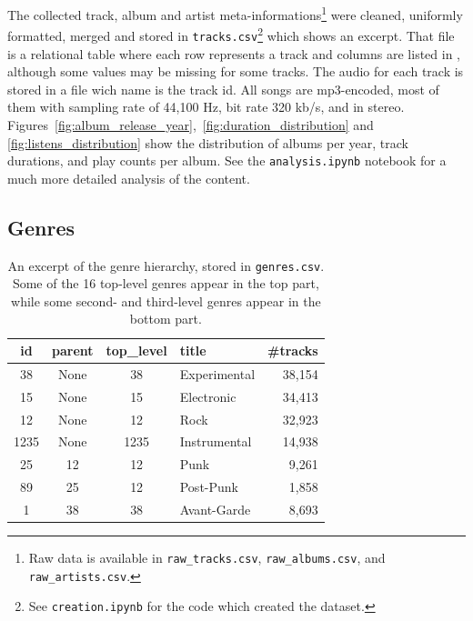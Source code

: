 \documentclass{article}
\newcommand{\todo}[1]{{\color{red} #1}}
\begin{document}
The collected track, album and artist meta-informations\footnote{Raw data is available in \texttt{raw\_tracks.csv}, \texttt{raw\_albums.csv}, and \texttt{raw\_artists.csv}.} were cleaned, uniformly formatted, merged and stored in \texttt{tracks.csv}\footnote{\label{creation}See \texttt{creation.ipynb} for the code which created the dataset.} which  shows an excerpt. That file is a relational table where each row represents a track and columns are listed in , although some values may be missing for some tracks. The audio for each track is stored in a file wich name is the track id. All songs are mp3-encoded, most of them with sampling rate of 44,100 Hz, bit rate 320 kb/s, and in stereo. Figures~\ref{fig:album_release_year},~\ref{fig:duration_distribution} and \ref{fig:listens_distribution} show the distribution of albums per year, track durations, and play counts per album.
See the \texttt{analysis.ipynb} notebook for a much more detailed analysis of the content.


\subsection{Genres}

\begin{table}
	\centering
	\begin{tabular}{ccclr}
		\toprule
		id & parent & top\_level & title & \#tracks \\
		\midrule
		38 & None & 38 & Experimental & 38,154 \\
		15 & None & 15 & Electronic & 34,413 \\
		12 & None & 12 & Rock & 32,923 \\
		1235 & None & 1235 & Instrumental & 14,938 \\
		\midrule
		25 & 12 & 12 & Punk & 9,261 \\
		89 & 25 & 12 & Post-Punk & 1,858 \\
		1  & 38 & 38 & Avant-Garde & 8,693 \\
		\bottomrule
	\end{tabular}
	\caption{An excerpt of the genre hierarchy, stored in \texttt{genres.csv}. Some of the 16 top-level genres appear in the top part, while some second- and third-level genres appear in the bottom part.}
	\label{tab:genres}
\end{table}
\end{document}
